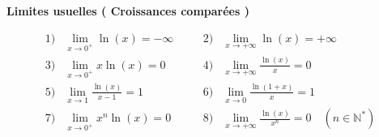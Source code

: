 \documentclass[12pt,a4paper]{article}
\begin{document}
\textbf{\color{myred} Limites usuelles ( Croissances comparées )}

\begin{tcolorbox}[colback=red!5!white,colframe=myred,title=\textbf{Formules des limites usuelles à retenir}]
\[
\begin{array}{rcccl}
1) & \lim_{x \to 0^+} \ln(x) = -\infty & \quad & 2) & \lim_{x \to +\infty} \ln(x) = +\infty \\[0.3cm]
3) & \lim_{x \to 0^+} x \ln(x) = 0 & \quad & 4) & \lim_{x \to +\infty} \frac{\ln(x)}{x} = 0 \\[0.3cm]
5) & \lim_{x \to 1} \frac{\ln(x)}{x - 1} = 1 & \quad & 6) & \lim_{x \to 0} \frac{\ln(1 + x)}{x} = 1\\[0.3cm]
7) & \lim_{x \to 0^+} x^{n}\ln(x) = 0 & \quad & 8) & \lim_{x \to +\infty} \frac{\ln(x)}{x^{n}} = 0 \quad (n \in \mathbb{N}^*)
\end{array}
\]
\end{tcolorbox}

\vspace{0.4cm}
\end{document}
